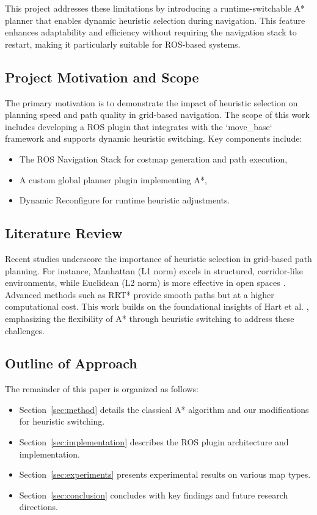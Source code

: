 \documentclass[letterpaper, 10 pt, conference]{ieeeconf}
\begin{document}
This project addresses these limitations by introducing a runtime-switchable A* planner that enables dynamic heuristic selection during navigation. This feature enhances adaptability and efficiency without requiring the navigation stack to restart, making it particularly suitable for ROS-based systems.

\subsection{Project Motivation and Scope}
The primary motivation is to demonstrate the impact of heuristic selection on planning speed and path quality in grid-based navigation. The scope of this work includes developing a ROS plugin that integrates with the `move\_base` framework and supports dynamic heuristic switching. Key components include:
\begin{itemize}
	\item The ROS Navigation Stack for costmap generation and path execution,
	\item A custom global planner plugin implementing A*,
	\item Dynamic Reconfigure for runtime heuristic adjustments.
\end{itemize}

\subsection{Literature Review}
Recent studies underscore the importance of heuristic selection in grid-based path planning. For instance, Manhattan (L1 norm) excels in structured, corridor-like environments, while Euclidean (L2 norm) is more effective in open spaces \cite{thrun2005probabilistic, lavalle2006planning}. Advanced methods such as RRT* \cite{karaman2011sampling} provide smooth paths but at a higher computational cost. This work builds on the foundational insights of Hart et al. \cite{hart1968formal}, emphasizing the flexibility of A* through heuristic switching to address these challenges.

\subsection{Outline of Approach}
The remainder of this paper is organized as follows:
\begin{itemize}
	\item Section~\ref{sec:method} details the classical A* algorithm and our modifications for heuristic switching.
	\item Section~\ref{sec:implementation} describes the ROS plugin architecture and implementation.
	\item Section~\ref{sec:experiments} presents experimental results on various map types.
	\item Section~\ref{sec:conclusion} concludes with key findings and future research directions.
\end{itemize}
\end{document}
